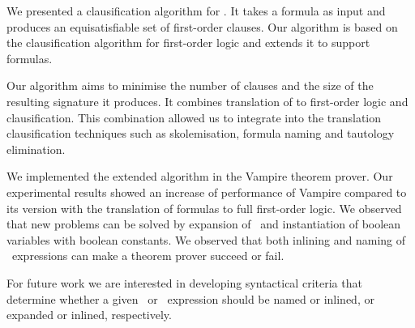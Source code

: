We presented a clausification algorithm for \folb{}. It takes a \folb{} formula as input and produces an equisatisfiable set of first-order clauses. Our algorithm is based on the \newcnf{} clausification algorithm for first-order logic and extends it to support \folb{} formulas.

Our algorithm aims to minimise the number of clauses and the size of the resulting signature it produces. It combines translation of \folb{} to first-order logic and clausification. This combination allowed us to integrate into the translation clausification techniques such as skolemisation, formula naming and tautology elimination.


We implemented the extended \newcnf{} algorithm in the Vampire theorem prover. Our experimental results showed an increase of performance of Vampire compared to its version with the translation of \folb{} formulas to full first-order logic. We observed that new problems can be solved by expansion of \ITE\ and instantiation of boolean variables with boolean constants. We observed that both inlining and naming of \LETIN\ expressions can make a theorem prover succeed or fail. 

For future work we are interested in developing syntactical criteria that determine whether a given \LETIN\ or \ITE\ expression should be named or inlined, or expanded or inlined, respectively. 


